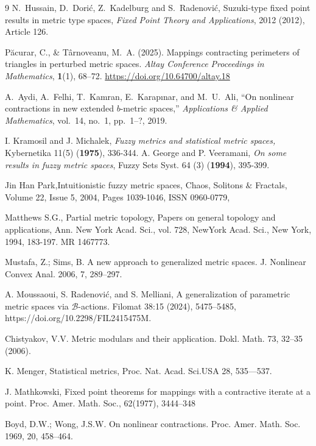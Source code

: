 \documentclass[sn-mathphys-num]{sn-jnl}%
\theoremstyle{thmstyleone}%
\theoremstyle{thmstyletwo}%
\theoremstyle{thmstylethree}%
\numberwithin{equation}{section}
\begin{document}
\begin{thebibliography}{9}
N.~Hussain, D.~Dorić, Z.~Kadelburg and S.~Radenović,
Suzuki-type fixed point results in metric type spaces,
\emph{Fixed Point Theory and Applications}, 2012 (2012), Article 126.


Păcurar, C., \& Târnoveanu, M.~A. (2025). Mappings contracting perimeters of triangles in perturbed metric spaces. \emph{Altay Conference Proceedings in Mathematics}, \textbf{1}(1), 68--72. \url{https://doi.org/10.64700/altay.18}

A.~Aydi, A.~Felhi, T.~Kamran, E.~Karapınar, and M.~U.~Ali,
``On nonlinear contractions in new extended $b$-metric spaces,''
\emph{Applications \& Applied Mathematics}, vol.~14, no.~1, pp.~1--?, 2019.

 I. Kramosil and J. Michalek, \emph{Fuzzy metrics and statistical metric spaces,} Kybernetika 11(5) (\textbf{1975}), 336-344.
A. George and P. Veeramani,\emph{ On some results in fuzzy metric spaces}, Fuzzy Sets Syst.  64 (3) (\textbf{1994}), 395-399.

Jin Han Park,Intuitionistic fuzzy metric spaces, Chaos, Solitons $\&$ Fractals, Volume 22, Issue 5, 2004, Pages 1039-1046, ISSN 0960-0779,


 Matthews S.G., Partial metric topology, Papers on general topology and applications, Ann. New York Acad. Sci., vol. 728, NewYork Acad. Sci., New York, 1994, 183-197. MR 1467773. 


Mustafa, Z.; Sims, B. A new approach to generalized metric spaces. J. Nonlinear Convex Anal. 2006, 7, 289–297.

A. Moussaoui, S. Radenovi\'c, and  S. Melliani, A generalization of parametric metric spaces via $\mathcal{B}$-actions. Filomat 38:15 (2024), 5475–5485, https://doi.org/10.2298/FIL2415475M.

Chistyakov, V.V. Metric modulars and their application. Dokl. Math. 73, 32–35 (2006).

K. Menger, Statistical metrics, Proc. Nat. Acad. Sci.USA 28, 535—537.


J. Mathkowski, Fixed point theorems for mappings with a contractive iterate at a point. Proc. Amer. Math. Soc., 62(1977), 3444–348

 Boyd, D.W.; Wong, J.S.W. On nonlinear contractions. Proc. Amer. Math. Soc. 1969, 20, 458–464. 


\end{thebibliography}
\end{document}
